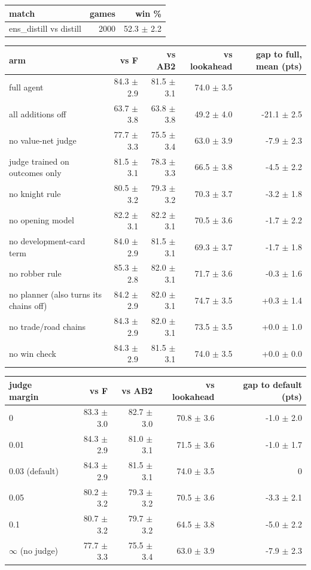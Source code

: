 \begin{tabular}{lrr}
\toprule
match & games & win \% \\
\midrule
ens\_distill vs distill & 2000 & 52.3 $\pm$ 2.2 \\
\bottomrule
\end{tabular}

\begin{tabular}{lrrrr}
\toprule
arm & vs F & vs AB2 & vs lookahead & gap to full, mean (pts) \\
\midrule
full agent & 84.3 $\pm$ 2.9 & 81.5 $\pm$ 3.1 & 74.0 $\pm$ 3.5 &  \\
all additions off & 63.7 $\pm$ 3.8 & 63.8 $\pm$ 3.8 & 49.2 $\pm$ 4.0 & -21.1 $\pm$ 2.5 \\
no value-net judge & 77.7 $\pm$ 3.3 & 75.5 $\pm$ 3.4 & 63.0 $\pm$ 3.9 & -7.9 $\pm$ 2.3 \\
judge trained on outcomes only & 81.5 $\pm$ 3.1 & 78.3 $\pm$ 3.3 & 66.5 $\pm$ 3.8 & -4.5 $\pm$ 2.2 \\
no knight rule & 80.5 $\pm$ 3.2 & 79.3 $\pm$ 3.2 & 70.3 $\pm$ 3.7 & -3.2 $\pm$ 1.8 \\
no opening model & 82.2 $\pm$ 3.1 & 82.2 $\pm$ 3.1 & 70.5 $\pm$ 3.6 & -1.7 $\pm$ 2.2 \\
no development-card term & 84.0 $\pm$ 2.9 & 81.5 $\pm$ 3.1 & 69.3 $\pm$ 3.7 & -1.7 $\pm$ 1.8 \\
no robber rule & 85.3 $\pm$ 2.8 & 82.0 $\pm$ 3.1 & 71.7 $\pm$ 3.6 & -0.3 $\pm$ 1.6 \\
no planner (also turns its chains off) & 84.2 $\pm$ 2.9 & 82.0 $\pm$ 3.1 & 74.7 $\pm$ 3.5 & +0.3 $\pm$ 1.4 \\
no trade/road chains & 84.3 $\pm$ 2.9 & 82.0 $\pm$ 3.1 & 73.5 $\pm$ 3.5 & +0.0 $\pm$ 1.0 \\
no win check & 84.3 $\pm$ 2.9 & 81.5 $\pm$ 3.1 & 74.0 $\pm$ 3.5 & +0.0 $\pm$ 0.0 \\
\bottomrule
\end{tabular}

\begin{tabular}{lrrrr}
\toprule
judge margin & vs F & vs AB2 & vs lookahead & gap to default (pts) \\
\midrule
0 & 83.3 $\pm$ 3.0 & 82.7 $\pm$ 3.0 & 70.8 $\pm$ 3.6 & -1.0 $\pm$ 2.0 \\
0.01 & 84.3 $\pm$ 2.9 & 81.0 $\pm$ 3.1 & 71.5 $\pm$ 3.6 & -1.0 $\pm$ 1.7 \\
0.03 (default) & 84.3 $\pm$ 2.9 & 81.5 $\pm$ 3.1 & 74.0 $\pm$ 3.5 & 0 \\
0.05 & 80.2 $\pm$ 3.2 & 79.3 $\pm$ 3.2 & 70.5 $\pm$ 3.6 & -3.3 $\pm$ 2.1 \\
0.1 & 80.7 $\pm$ 3.2 & 79.7 $\pm$ 3.2 & 64.5 $\pm$ 3.8 & -5.0 $\pm$ 2.2 \\
$\infty$ (no judge) & 77.7 $\pm$ 3.3 & 75.5 $\pm$ 3.4 & 63.0 $\pm$ 3.9 & -7.9 $\pm$ 2.3 \\
\bottomrule
\end{tabular}

